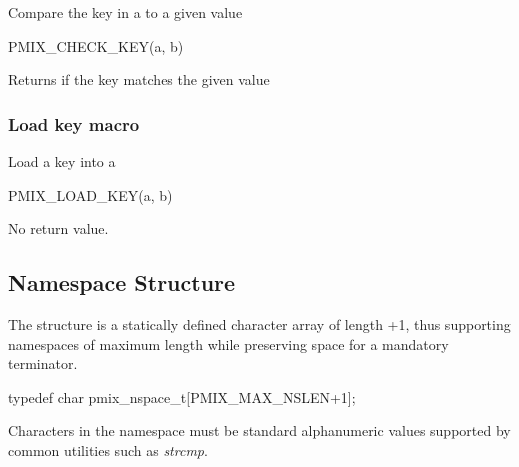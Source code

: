 Compare the key in a  to a given value

\cspecificstart
\begin{codepar}
PMIX_CHECK_KEY(a, b)
\end{codepar}
\cspecificend

\begin{arglist}
\end{arglist}

Returns  if the key matches the given value

\subsubsection{Load key macro}

Load a key into a 

\cspecificstart
\begin{codepar}
PMIX_LOAD_KEY(a, b)
\end{codepar}
\cspecificend

\begin{arglist}
\end{arglist}

No return value.

\subsection{Namespace Structure}

The  structure is a statically defined character array of length +1, thus supporting namespaces of maximum length  while preserving space for a mandatory  terminator.

\cspecificstart
\begin{codepar}
typedef char pmix_nspace_t[PMIX_MAX_NSLEN+1];
\end{codepar}
\cspecificend

Characters in the namespace must be standard alphanumeric values supported by common utilities such as \textit{strcmp}.

